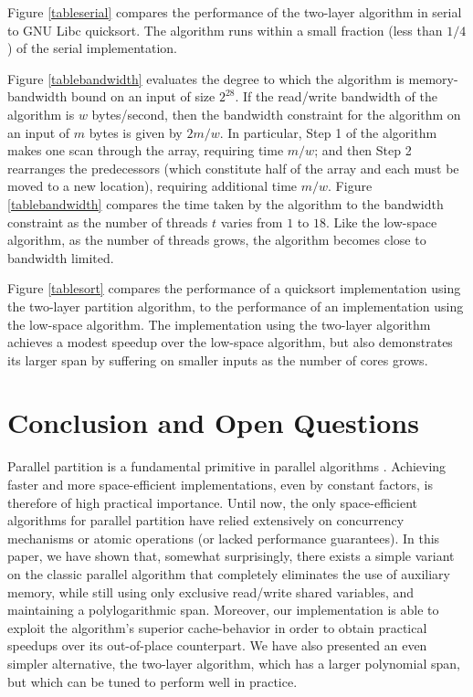 \documentclass[sigconf]{acmart}
\theoremstyle{remark}
\theoremstyle{remark}
\begin{document}
Figure \ref{tableserial} compares the performance of the two-layer
algorithm in serial to GNU Libc quicksort. The algorithm runs within a
small fraction (less than $1/4$) of the serial implementation.

Figure \ref{tablebandwidth} evaluates the degree to which the
algorithm is memory-bandwidth bound on an input of size $2^{28}$. If
the read/write bandwidth of the algorithm is $w$ bytes/second, then
the bandwidth constraint for the algorithm on an input of $m$ bytes is
given by $2m / w$. In particular, Step 1 of the algorithm makes one
scan through the array, requiring time $m / w$; and then Step 2
rearranges the predecessors (which constitute half of the array and
each must be moved to a new location), requiring additional time $m /
w$. Figure \ref{tablebandwidth} compares the time taken by the
algorithm to the bandwidth constraint as the number of threads $t$
varies from $1$ to $18$. Like the low-space algorithm, as the number
of threads grows, the algorithm becomes close to bandwidth limited.

Figure \ref{tablesort} compares the performance of a quicksort
implementation using the two-layer partition algorithm, to the
performance of an implementation using the low-space algorithm. The
implementation using the two-layer algorithm achieves a modest speedup
over the low-space algorithm, but also demonstrates its larger span by
suffering on smaller inputs as the number of cores grows.


\section{Conclusion and Open Questions}

Parallel partition is a fundamental primitive in parallel algorithms
\cite{Blelloch96,AcarBl16}. Achieving faster and more space-efficient
implementations, even by constant factors, is therefore of high
practical importance. Until now, the only space-efficient algorithms
for parallel partition have relied extensively on concurrency
mechanisms or atomic operations (or lacked performance guarantees). In
this paper, we have shown that, somewhat surprisingly, there exists a
simple variant on the classic parallel algorithm that completely
eliminates the use of auxiliary memory, while still using only
exclusive read/write shared variables, and maintaining a
polylogarithmic span. Moreover, our implementation is able to exploit
the algorithm's superior cache-behavior in order to obtain practical
speedups over its out-of-place counterpart. We have also presented an
even simpler alternative, the two-layer algorithm, which has a larger
polynomial span, but which can be tuned to perform well in practice.
\end{document}

